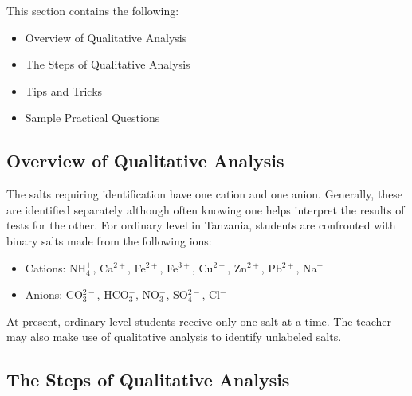 This section contains the following:
\begin{itemize}[topsep=0ex,itemsep=0ex,partopsep=1ex,parsep=1ex]
	\item Overview of Qualitative Analysis
	\item The Steps of Qualitative Analysis
	\item Tips and Tricks
	\item Sample Practical Questions
\end{itemize}

\subsection{Overview of Qualitative Analysis}

The salts requiring identification have one cation and one anion. Generally, these are identified separately although often knowing one helps interpret the results of tests for the other. For ordinary level in Tanzania, students are confronted with binary salts made from the following ions:

\begin{itemize}
\item{Cations: NH$_{4}^{+}$, 
Ca$^{2+}$, 
Fe$^{2+}$, 
Fe$^{3+}$, 
Cu$^{2+}$, 
Zn$^{2+}$, 
Pb$^{2+}$, 
Na$^{+}$}
\item{Anions: CO$_{3}^{2-}$, 
HCO$_{3}^{-}$, 
NO$_{3}^{-}$, 
SO$_{4}^{2-}$, 
Cl$^{-}$}
\end{itemize}
At present, ordinary level students receive only one salt at a time. The teacher may also make use of qualitative analysis to identify unlabeled salts. 

\subsection{The Steps of Qualitative Analysis}


